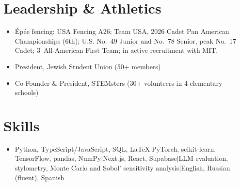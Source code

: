 \documentclass[letterpaper,11pt]{article}
\newcommand{\sep}{\enspace$|$\enspace}
\begin{document}
\section{Leadership \& Athletics}
\begin{itemize}
  \item \'Ep\'ee fencing: USA Fencing A26; Team USA, 2026 Cadet Pan American Championships (6th); U.S. No.\ 49 Junior and No.\ 78 Senior, peak No.\ 17 Cadet; 3\texttimes\ All-American First Team; in active recruitment with MIT.
  \item President, Jewish Student Union (50+ members)
  \item Co-Founder \& President, STEMsters (30+ volunteers in 4 elementary schools)
\end{itemize}

\section{Skills}
\begin{itemize}
  \item Python, TypeScript/JavaScript, SQL, LaTeX\sep PyTorch, scikit-learn, TensorFlow, pandas, NumPy\sep Next.js, React, Supabase\sep LLM evaluation, stylometry, Monte Carlo and Sobol' sensitivity analysis\sep English, Russian (fluent), Spanish
\end{itemize}
\end{document}
